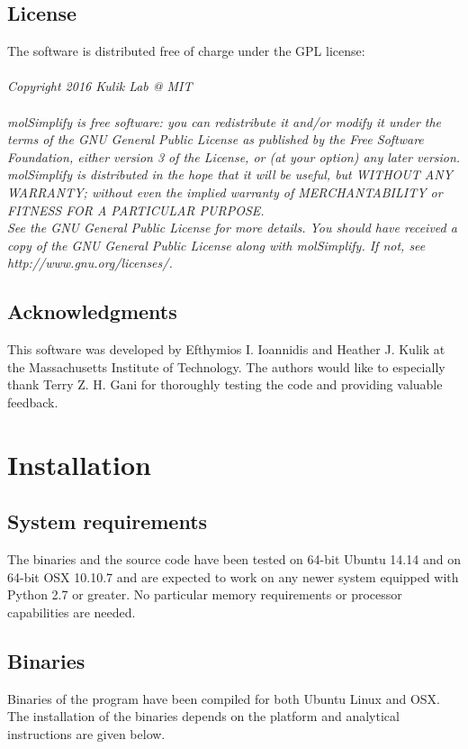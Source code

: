 \documentclass[a4paper,12pt]{assignment}
\begin{document}
\subsection{License}
The software is distributed free of charge under the GPL license: \\  \\
\textit{Copyright 2016 Kulik Lab @ MIT\\ \\
    molSimplify is free software: you can redistribute it and/or modify it under the terms of the GNU General Public License as published by the Free Software Foundation, either version 3 of the License, or (at your option) any later version. molSimplify is distributed in the hope that it will be useful,  but WITHOUT ANY WARRANTY; without even the implied warranty of MERCHANTABILITY or FITNESS FOR A PARTICULAR PURPOSE.\\    See the GNU General Public License for more details.     You should have received a copy of the GNU General Public License 
    along with molSimplify. If not, see http://www.gnu.org/licenses/.
}

\subsection{Acknowledgments}
This software was developed by Efthymios I. Ioannidis and Heather J. Kulik at the Massachusetts Institute of Technology. The authors would like to especially thank Terry Z. H. Gani for thoroughly testing the code and providing valuable feedback.

\newpage


\section{Installation}
\subsection{System requirements}
The binaries and the source code have been tested on 64-bit Ubuntu 14.14 and on 64-bit OSX 10.10.7 and are expected to work on any newer system equipped with Python 2.7 or greater. No particular memory requirements or processor capabilities are needed. 


\subsection{Binaries}

Binaries of the program have been compiled for both Ubuntu Linux and OSX. The installation of the binaries depends on the platform and analytical instructions are given below.
\end{document}
